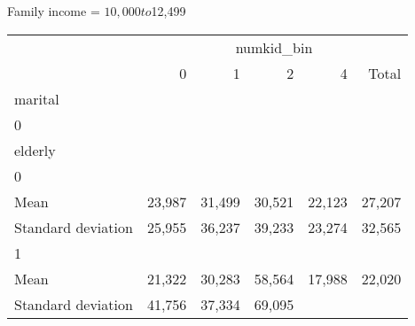 Family income = $10,000 to $12,499
\begin{tabular}{llllll}
\cline{1-6}
\multicolumn{1}{c}{} &
  \multicolumn{5}{|c}{numkid\_bin} \\
\multicolumn{1}{c}{} &
  \multicolumn{1}{|r}{0} &
  \multicolumn{1}{r}{1} &
  \multicolumn{1}{r}{2} &
  \multicolumn{1}{r}{4} &
  \multicolumn{1}{r}{Total} \\
\cline{1-6}
\multicolumn{1}{l}{marital} &
  \multicolumn{1}{|r}{} &
  \multicolumn{1}{r}{} &
  \multicolumn{1}{r}{} &
  \multicolumn{1}{r}{} &
  \multicolumn{1}{r}{} \\
\multicolumn{1}{l}{\hspace{1em}0} &
  \multicolumn{1}{|r}{} &
  \multicolumn{1}{r}{} &
  \multicolumn{1}{r}{} &
  \multicolumn{1}{r}{} &
  \multicolumn{1}{r}{} \\
\multicolumn{1}{l}{\hspace{2em}elderly} &
  \multicolumn{1}{|r}{} &
  \multicolumn{1}{r}{} &
  \multicolumn{1}{r}{} &
  \multicolumn{1}{r}{} &
  \multicolumn{1}{r}{} \\
\multicolumn{1}{l}{\hspace{3em}0} &
  \multicolumn{1}{|r}{} &
  \multicolumn{1}{r}{} &
  \multicolumn{1}{r}{} &
  \multicolumn{1}{r}{} &
  \multicolumn{1}{r}{} \\
\multicolumn{1}{l}{\hspace{4em}Mean} &
  \multicolumn{1}{|r}{23,987} &
  \multicolumn{1}{r}{31,499} &
  \multicolumn{1}{r}{30,521} &
  \multicolumn{1}{r}{22,123} &
  \multicolumn{1}{r}{27,207} \\
\multicolumn{1}{l}{\hspace{4em}Standard deviation} &
  \multicolumn{1}{|r}{25,955} &
  \multicolumn{1}{r}{36,237} &
  \multicolumn{1}{r}{39,233} &
  \multicolumn{1}{r}{23,274} &
  \multicolumn{1}{r}{32,565} \\
\multicolumn{1}{l}{\hspace{3em}1} &
  \multicolumn{1}{|r}{} &
  \multicolumn{1}{r}{} &
  \multicolumn{1}{r}{} &
  \multicolumn{1}{r}{} &
  \multicolumn{1}{r}{} \\
\multicolumn{1}{l}{\hspace{4em}Mean} &
  \multicolumn{1}{|r}{21,322} &
  \multicolumn{1}{r}{30,283} &
  \multicolumn{1}{r}{58,564} &
  \multicolumn{1}{r}{17,988} &
  \multicolumn{1}{r}{22,020} \\
\multicolumn{1}{l}{\hspace{4em}Standard deviation} &
  \multicolumn{1}{|r}{41,756} &
  \multicolumn{1}{r}{37,334} &
  \multicolumn{1}{r}{69,095} &

\end{tabular}
